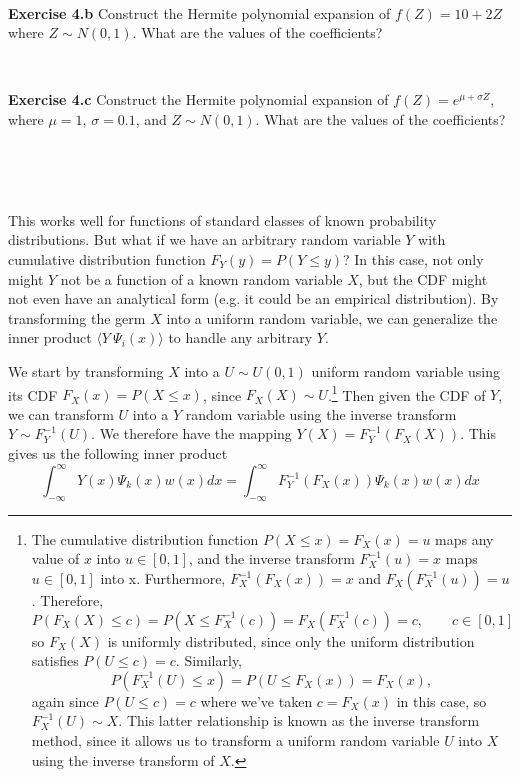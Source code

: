 \documentclass[11pt]{article}
\numberwithin{equation}{section}
\begin{document}
\

\textbf{Exercise 4.b} Construct the Hermite polynomial expansion of $f(Z) = 10 + 2Z$ where $Z \sim N(0,1)$. What are the values of the coefficients?

\

\textbf{Exercise 4.c} Construct the Hermite polynomial expansion of $f(Z) = e^{\mu + \sigma Z}$, where $\mu = 1$, $\sigma = 0.1$, and $Z \sim N(0,1)$. What are the values of the coefficients?

\

\




This works well for functions of standard classes of known probability distributions. But what if we have an arbitrary random variable $Y$ with cumulative distribution function $F_Y(y) = P(Y \leq y)$? In this case, not only might $Y$ not be a function of a known random variable $X$, but the CDF might not even have an analytical form (e.g. it could be an empirical distribution). By transforming the germ $X$ into a uniform random variable, we can generalize the inner product $\langle Y \ \Psi_i(x) \rangle$ to handle any arbitrary $Y$.

\qquad We start by transforming $X$ into a $U \sim U(0,1)$ uniform random variable using its CDF $F_X(x) = P(X \leq x)$, since $F_X(X) \sim U$.\footnote{The cumulative distribution function $P(X \leq x) = F_X(x) = u$ maps any value of $x$ into $u \in [0, 1]$, and the inverse transform $F_X^{-1}(u) = x$ maps $u \in [0, 1]$ into x. Furthermore, $F_X^{-1}(F_X(x)) = x$ and $F_X(F_X^{-1}(u)) = u$. Therefore, 
\begin{equation*}
P(F_X(X) \leq c) = P(X \leq F_X^{-1}(c)) = F_X(F_X^{-1}(c)) = c, \qquad c \in [0, 1]
\end{equation*}
so $F_X(X)$ is uniformly distributed, since only the uniform distribution satisfies $P(U \leq c) = c$. Similarly,
\begin{equation*}
P(F_X^{-1}(U) \leq x) = P(U \leq F_X(x)) = F_X(x),
\end{equation*}
again since $P(U \leq c) = c$ where we've taken $c = F_X(x)$ in this case, so $F_X^{-1}(U) \sim X$. This latter relationship is known as the inverse transform method, since it allows us to transform a uniform random variable $U$ into $X$ using the inverse transform of $X$.}
Then given the CDF of $Y$, we can transform $U$ into a $Y$ random variable using the inverse transform $Y \sim F_Y^{-1}(U)$. We therefore have the mapping $Y(X) = F_Y^{-1} (F_X(X))$. This gives us the following inner product
\begin{equation}
\int_{-\infty}^{\infty} Y(x) \Psi_k(x) w(x) dx = \int_{-\infty}^{\infty} F_Y^{-1} (F_X(x)) \Psi_k(x) w(x) dx \label{ip_arb}
\end{equation}
\end{document}
